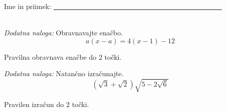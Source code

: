 \documentclass[addpoints]{exam}
\begin{document}
\begin{questions}






     \newpage

     \noindent Ime in priimek: \underline{~~~~~~~~~~~~~~~~~~~~~~~~~~~~~~~~~~~~~~~~~~~~~~~~}

     ~\\

    \bonusquestion[2]
    \textit{Dodatna naloga:} Obravnavajte enačbo. $$a(x-a)=4(x-1)-12$$

    \begin{solution}[10cm]
        Pravilna obravnava enačbe do $2$ točki.
    \end{solution}




        

    \bonusquestion[2]
    \textit{Dodatna naloga:} Natančno izračunajte. $$ \left(\sqrt{3}+\sqrt{2}\right)\sqrt{5-2\sqrt{6}} $$

    \begin{solution}[7cm]
        Pravilen izračun do $2$ točki.
    \end{solution}




\end{questions}
\end{document}
